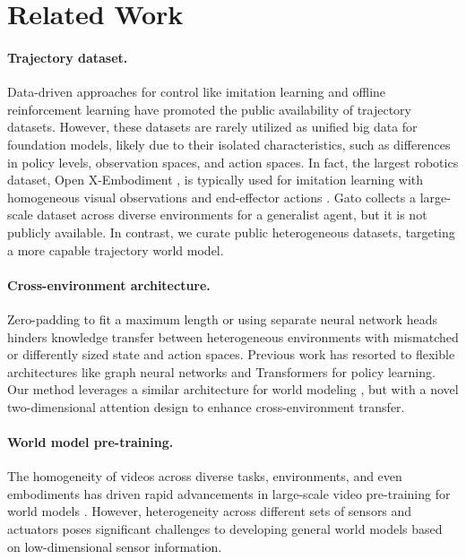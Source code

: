 \section{Related Work}
\paragraph{Trajectory dataset.} Data-driven approaches for control like imitation learning \cite{florence2022implicit, shafiullah2022behavior, gallouedec2024jack} and offline reinforcement learning \cite{fu2020d4rl, rafailov2024d5rl, gulcehre2020rl, qin2022neorl} have promoted the public availability of trajectory datasets. However, these datasets are rarely utilized as unified big data for foundation models, likely due to their isolated characteristics, such as differences in policy levels, observation spaces, and action spaces. In fact, the largest robotics dataset, Open X-Embodiment \cite{o2024open}, is typically used for imitation learning with homogeneous visual observations and end-effector actions \cite{team2024octo, kim2024openvla}. Gato \cite{reed2022generalist} collects a large-scale dataset across diverse environments for a generalist agent, but it is not publicly available. In contrast, we curate public heterogeneous datasets, targeting a more capable trajectory world model.

\paragraph{Cross-environment architecture.} Zero-padding to fit a maximum length \cite{yu2020meta, hansen2023td, schmied2024learning, seo2022reinforcement} or using separate neural network heads \cite{wang2024scaling, d2024sharing} hinders knowledge transfer between heterogeneous environments with mismatched or differently sized state and action spaces. Previous work has resorted to flexible architectures like graph neural networks \cite{huang2020one, kurin2020my} and Transformers \cite{gupta2022metamorph, hong2021structure} for policy learning. Our method leverages a similar architecture for world modeling \cite{janner2021offline, zhang2021autoregressive}, but with a novel two-dimensional attention design to enhance cross-environment transfer.

\paragraph{World model pre-training.} The homogeneity of videos across diverse tasks, environments, and even embodiments has driven rapid advancements in large-scale video pre-training for world models \cite{seo2022reinforcement, wu2024pre, wu2024ivideogpt, ye2024latent, cheang2024gr}. However, heterogeneity across different sets of sensors and actuators poses significant challenges to developing general world models based on low-dimensional sensor information.

